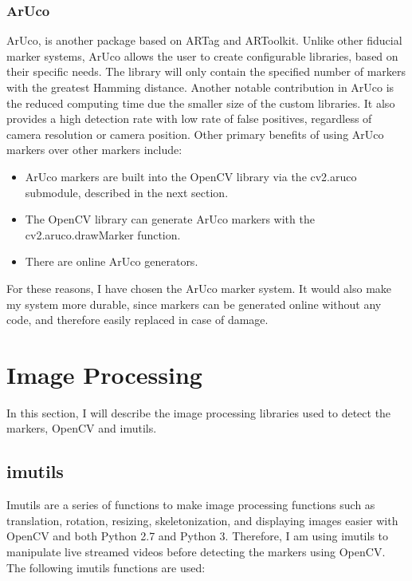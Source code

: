 \documentclass[oneside,%
                    author={Malak Hajji},
                    degree={BSc},
                    title={Designing An Accessible Computational Toolkit For Students},
                  subtitle={With Mixed Visual Abilities}]{dissertation}
\begin{document}
\subsubsection{ArUco}
ArUco\cite{aruco}, is another package based on ARTag and ARToolkit. Unlike other fiducial marker systems, ArUco allows the user to create configurable libraries, based on their specific needs. The library will only contain the specified number of markers with the greatest Hamming distance. Another notable contribution in ArUco is the reduced computing time due the smaller size of the custom libraries. It also provides a high detection rate with low rate of false positives, regardless of camera resolution or camera position. 
Other primary benefits of using ArUco markers over other markers include:

\begin{itemize}
  
\item ArUco markers are built into the OpenCV library via the cv2.aruco  submodule\cite{opencv-aruco}, described in the next section. 
\item	The OpenCV library can generate ArUco markers with the cv2.aruco.drawMarker
 function.
\item	There are online ArUco generators\cite{online-aruco}.

\end{itemize}
For these reasons, I have chosen the ArUco marker system. It would also make my system more durable, since markers can be generated online without any code, and therefore easily replaced in case of damage.

\section{Image Processing}
In this section, I will describe the image processing libraries used to detect the markers, OpenCV and imutils.

\subsection{imutils}

\noindent
Imutils are a series of functions to make image processing functions such as translation, rotation, resizing, skeletonization, and displaying images easier with OpenCV and both Python 2.7 and Python 3. Therefore, I am using imutils to manipulate live streamed videos before detecting the markers using OpenCV. The following imutils functions are used:
\end{document}
